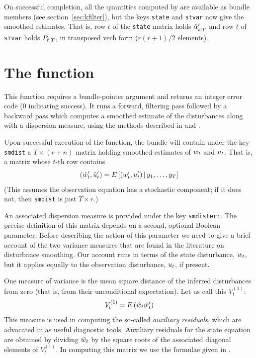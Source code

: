 On successful completion, all the quantities computed by
 are available as bundle members (see
section~\ref{sec:kfilter}), but the keys \texttt{state} and
\texttt{stvar} now give the smoothed estimates.  That is, row $t$ of
the \texttt{state} matrix holds $\hat{\alpha}_{t|T}'$ and row $t$
of \texttt{stvar} holds $P_{t|T}$, in transposed vech form
($r(r+1)/2$ elements).

\section{The  function}
\label{sec:kdsmooth}

This function requires a bundle-pointer argument and returns an
integer error code (0 indicating success).  It runs a forward,
filtering pass followed by a backward pass which computes a smoothed
estimate of the disturbances along with a dispersion measure, using
the methods described in \cite{koopman93} and \cite{koopman-etal99}.

Upon successful execution of the function, the bundle will contain
under the key \texttt{smdist} a $T \times (r+n)$ matrix holding
smoothed estimates of $w_t$ and $u_t$. That is, a matrix
whose $t$-th row contains
\[
(\hat{w}_t' , \hat{u}_t')
 = E\left[ (w_t' , u_t') \,| \,
   y_1, \ldots, y_T \right]
\]
(This assumes the observation equation has a stochastic component; if
it does not, then \texttt{smdist} is just $T \times r$.)

An associated dispersion measure is provided under the key
\texttt{smdisterr}. The precise definition of this matrix depends on a
second, optional Boolean parameter. Before describing the action of
this parameter we need to give a brief account of the two variance
measures that are found in the literature on disturbance
smoothing. Our account runs in terms of the state disturbance,
$w_t$, but it applies equally to the observation disturbance,
$u_t$, if present.

One measure of variance is the mean square distance of the inferred
disturbances from zero (that is, from their unconditional
expectation). Let us call this $V^{(1)}_t$:
\[
V^{(1)}_t = E\left(\hat{w}_t\hat{w}_t'\right)
\]
This measure is used in computing the so-called \emph{auxiliary
  residuals}, which are advocated in \cite{durbin-koopman12} as useful
diagnostic tools. Auxiliary residuals for the state equation are
obtained by dividing $\hat{w}_t$ by the square roots of the
associated diagonal elements of $V^{(1)}_t$. In computing this matrix
we use the formulae given in \citet[section 4.4]{koopman-etal99}.

